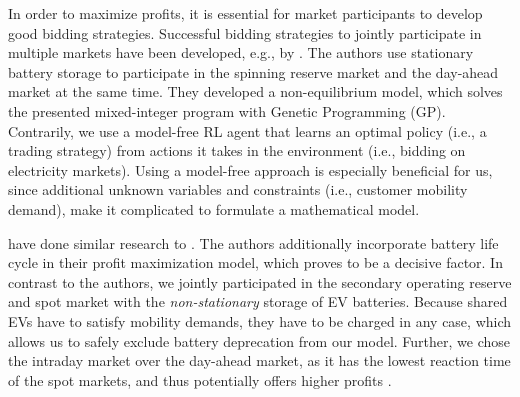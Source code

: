 \documentclass[12pt, article]{article}
\begin{document}
In order to maximize profits, it is essential for market participants to develop
good bidding strategies. Successful bidding strategies to jointly participate in
multiple markets have been developed, e.g., by
\textcite{mashhour11_biddin_strat_virtual_power_plant_2}. The authors use
stationary battery storage to participate in the spinning reserve market and the
day-ahead market at the same time. They developed a non-equilibrium model, which
solves the presented mixed-integer program with Genetic Programming (GP).
Contrarily, we use a model-free RL agent that learns an optimal policy (i.e., a
trading strategy) from actions it takes in the environment (i.e., bidding on
electricity markets). Using a model-free approach is especially beneficial for
us, since additional unknown variables and constraints (i.e., customer mobility
demand), make it complicated to formulate a mathematical model.

\textcite{he16_optim_biddin_strat_batter_storag} have done similar research to
\textcite{mashhour11_biddin_strat_virtual_power_plant_2}. The authors additionally
incorporate battery life cycle in their profit maximization model, which proves
to be a decisive factor. In contrast to the authors, we jointly participated in
the secondary operating reserve and spot market with the \emph{non-stationary}
storage of EV batteries. Because shared EVs have to satisfy mobility demands,
they have to be charged in any case, which allows us to safely exclude battery
deprecation from our model. Further, we chose the intraday market over the
day-ahead market, as it has the lowest reaction time of the spot markets, and
thus potentially offers higher profits
\parencite{tomic07_using_fleet_elect_drive_vehic_grid_suppor}.
\end{document}
